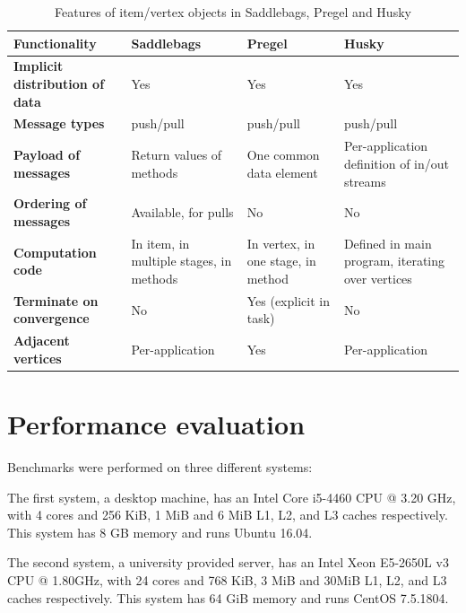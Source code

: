 \documentclass{uit-report}
\begin{document}
\begin{table}[b!]
	\begin{center}

	\setlength\arrayrulewidth{1pt}
	\renewcommand{\arraystretch}{2}
	\begin{tabular}{ | p{4cm} | p{3.5cm} | p{3.5cm} | p{3.5cm} |}
		\hline
		\textbf{Functionality} & \textbf{Saddlebags} & \textbf{Pregel} & \textbf{Husky}\\ \hline
		\textbf{Implicit distribution of data} & Yes & Yes & Yes \\ \hline
		\textbf{Message types} & push/pull & push/pull & push/pull \\ \hline
		\textbf{Payload of messages} &Return values of methods  & One common data element & Per-application definition of in/out streams\\ \hline
		\textbf{Ordering of messages} & Available, for pulls & No & No \\ \hline
		\textbf{Computation code} & In item, in multiple stages, in methods & In vertex, in one stage, in method & Defined in main program, iterating over vertices \\ \hline
		\textbf{Terminate on convergence} & No & Yes (explicit in task) & No \\ \hline
		\textbf{Adjacent vertices} & Per-application & Yes & Per-application \\ \hline
	\end{tabular}
	\caption{Features of item/vertex objects in Saddlebags, Pregel and Husky}
	\label{table:programmability}

	\end{center}
\end{table}

\section{Performance evaluation} \label{section:performance}
Benchmarks were performed on three different systems:

The first system, a desktop machine, has an Intel Core i5-4460 CPU @ 3.20 GHz, with 4 cores and 256 KiB, 1 MiB and 6 MiB L1, L2, and L3 caches respectively. This system has 8 GB memory and runs Ubuntu 16.04.

The second system, a university provided server, has an Intel Xeon E5-2650L v3 CPU @ 1.80GHz, with 24 cores and 768 KiB, 3 MiB and 30MiB L1, L2, and L3 caches respectively. This system has 64 GiB memory and runs CentOS 7.5.1804.
\end{document}
